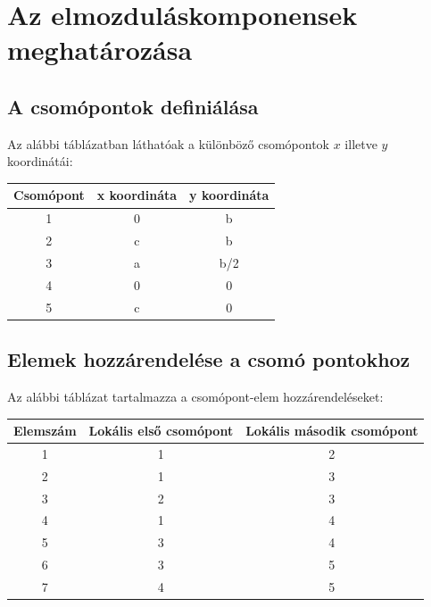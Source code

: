 \documentclass[12pt,a4paper]{article}
\begin{document}
\section{Az elmozduláskomponensek meghatározása}
\subsection{A csomópontok definiálása}
Az alábbi táblázatban láthatóak a különböző csomópontok $x$ illetve
$y$ koordinátái:
\begin{center}
    \begin{tabular}{|c|c|c|}
        \hline
        Csomópont & x koordináta & y koordináta \\
        \hline
        \hline
        1         & 0            & b            \\
        \hline
        2         & c            & b            \\
        \hline
        3         & a            & b/2          \\
        \hline
        4         & 0            & 0            \\
        \hline
        5         & c            & 0            \\
        \hline
    \end{tabular}
\end{center}
\subsection{Elemek hozzárendelése a csomó pontokhoz}
Az alábbi táblázat tartalmazza a csomópont-elem hozzárendeléseket:
\begin{center}
    \begin{tabular}{|c|c|c|}
        \hline
        Elemszám & Lokális első csomópont & Lokális második csomópont \\
        \hline
        \hline
        1        & 1                      & 2                         \\
        \hline
        2        & 1                      & 3                         \\
        \hline
        3        & 2                      & 3                         \\
        \hline
        4        & 1                      & 4                         \\
        \hline
        5        & 3                      & 4                         \\
        \hline
        6        & 3                      & 5                         \\
        \hline
        7        & 4                      & 5                         \\
        \hline
    \end{tabular}
\end{center}
\end{document}
